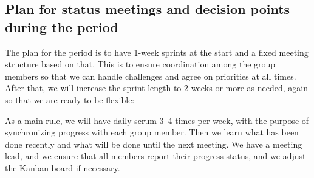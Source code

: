 \subsection{Plan for status meetings and decision points during the period}
\label{appsec:}

The plan for the period is to have 1-week sprints at the start and a fixed meeting structure based on that. This is to ensure coordination among the group members so that we can handle challenges and agree on priorities at all times. After that, we will increase the sprint length to 2 weeks or more as needed, again so that we are ready to be flexible:

As a main rule, we will have daily scrum 3--4 times per week, with the purpose of synchronizing progress with each group member. Then we learn what has been done recently and what will be done until the next meeting. We have a meeting lead, and we ensure that all members report their progress status, and we adjust the Kanban board if necessary.

